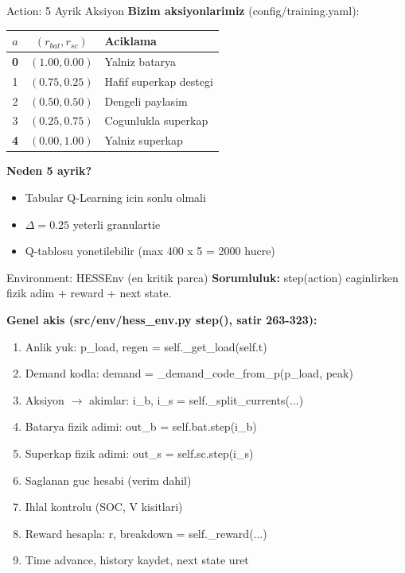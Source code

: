 \documentclass[10pt,aspectratio=169]{beamer}
\begin{document}
\begin{frame}{Action: 5 Ayrik Aksiyon}
\textbf{Bizim aksiyonlarimiz} (config/training.yaml):

\begin{center}
\begin{tabular}{ccl}
\toprule
$a$ & $(r_{bat}, r_{sc})$ & Aciklama \\
\midrule
\textcolor{green!50!black}{\textbf{0}} & $(1.00, 0.00)$ & Yalniz batarya \\
1 & $(0.75, 0.25)$ & Hafif superkap destegi \\
2 & $(0.50, 0.50)$ & Dengeli paylasim \\
3 & $(0.25, 0.75)$ & Cogunlukla superkap \\
\textcolor{blue!70!black}{\textbf{4}} & $(0.00, 1.00)$ & Yalniz superkap \\
\bottomrule
\end{tabular}
\end{center}

\vspace{0.4em}
\textbf{Neden 5 ayrik?}
\begin{itemize}
  \item Tabular Q-Learning icin sonlu olmali
  \item $\Delta = 0.25$ yeterli granulartie
  \item Q-tablosu yonetilebilir (max 400 x 5 = 2000 hucre)
\end{itemize}
\end{frame}

\begin{frame}{Environment: HESSEnv (en kritik parca)}
\textbf{Sorumluluk:} step(action) caginlirken fizik adim + reward + next state.

\vspace{0.3em}
\textbf{Genel akis (src/env/hess\_env.py step(), satir 263-323):}
\begin{enumerate}\footnotesize
  \item Anlik yuk: p\_load, regen = self.\_get\_load(self.t)
  \item Demand kodla: demand = \_demand\_code\_from\_p(p\_load, peak)
  \item Aksiyon $\to$ akimlar: i\_b, i\_s = self.\_split\_currents(...)
  \item Batarya fizik adimi: out\_b = self.bat.step(i\_b)
  \item Superkap fizik adimi: out\_s = self.sc.step(i\_s)
  \item Saglanan guc hesabi (verim dahil)
  \item Ihlal kontrolu (SOC, V kisitlari)
  \item Reward hesapla: r, breakdown = self.\_reward(...)
  \item Time advance, history kaydet, next state uret
\end{enumerate}
\end{frame}
\end{document}
